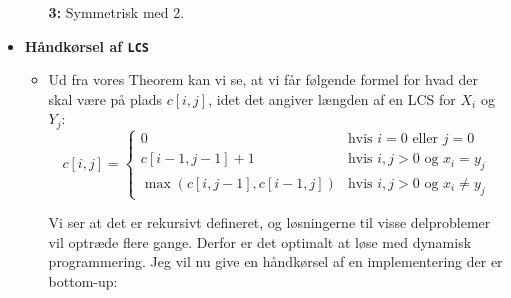 \begin{itemize}
\begin{enumerate}
	
	\item[\textbf{3:}]
	Symmetrisk med 2.

\end{enumerate}\vspace{1em}


\item \textbf{Håndkørsel af \texttt{LCS}}
\begin{itemize}
	\item 
Ud fra vores Theorem kan vi se, at vi får følgende formel for hvad der skal være på plads $c[i, j]$, idet det angiver længden af en LCS for $X_i$ og $Y_j$:
$$
c[i, j] = \begin{cases}
	0 & \text{hvis $i = 0$ eller $j = 0$}\\
	c[i-1, j-1] + 1 & \text{hvis $i,j > 0$ og $x_i = y_j$}\\
	\max(c[i, j-1], c[i-1, j]) & \text{hvis $i,j > 0$ og $x_i \neq y_j$}
\end{cases}
$$

Vi ser at det er rekursivt defineret, og løsningerne til visse delproblemer vil optræde flere gange. Derfor er det optimalt at løse med dynamisk programmering. Jeg vil nu give en håndkørsel af en implementering der er bottom-up:


\end{itemize}
\end{itemize}
